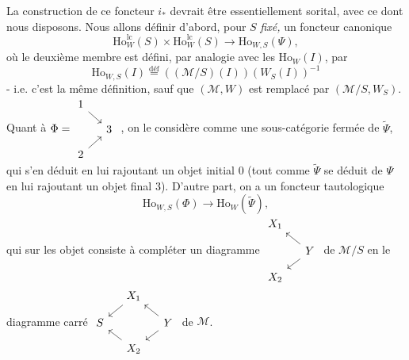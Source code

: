 \documentclass[11pt]{article}
\newcommand{\msp}[1]{\marginpar{\footnotesize [#1]}}
\newcommand{\Ho}{\mathrm{Ho}}
\newcommand{\lc}{\mathrm{lc}}
\begin{document}
\msp{page 244}
La construction de ce foncteur $i_*$ devrait être essentiellement sorital, avec ce dont nous disposons. Nous allons définir d'abord, pour $S$ \textit{fixé,} un foncteur canonique
\[
\Ho^{\lc}_W(S) \times \Ho^{\lc}_W(S) \longrightarrow \Ho_{W,S}(\Psi), \tag*{$(*)$}
\]
où le deuxième membre est défini, par analogie avec les $\Ho_W(I)$, par
\[
\Ho_{W,S}(I) \overset{\text{déf}}{=} ((\mathcal{M}/S)(I))(W_S(I))^{-1}
\]
- i.e. c'est la même définition, sauf que $(\mathcal{M}, W)$ est remplacé par $(\mathcal{M}/S, W_S)$. Quant à $\Phi = \vcenter{\hbox{\begin{tikzcd}[ampersand replacement=\&, row sep=small, column sep=small]
1 \arrow[dr] \& \\
 \& 3 \\
2 \arrow[ur] \&
\end{tikzcd}}}$ , on le considère comme une sous-catégorie fermée de $\tilde{\Psi}$, qui s'en déduit en lui rajoutant un objet initial 0 (tout comme $\tilde{\Psi}$ se déduit de $\Psi$ en lui rajoutant un objet final 3). D'autre part, on a un foncteur tautologique
\[
\Ho_{W,S}(\Phi) \longrightarrow \Ho_W(\tilde{\Psi}), \tag*{$(*')$}
\]
qui sur les objet consiste à compléter un diagramme $\vcenter{\hbox{\begin{tikzcd}[ampersand replacement=\&, row sep=small, column sep=small] %
X_1 \& \\
 \& Y \arrow[ul] \arrow[dl] \\
X_2 \&
\end{tikzcd}}}$ de $\mathcal{M}/S$ en le diagramme carré $\vcenter{\hbox{\begin{tikzcd}[ampersand replacement=\&, row sep=small, column sep=small]
 \& X_1 \arrow[dl] \& \\
S \& \& Y \arrow[ul] \arrow[dl] \\
 \& X_2 \arrow[ul] \&
\end{tikzcd}}}$ de $\mathcal{M}$.
\end{document}
